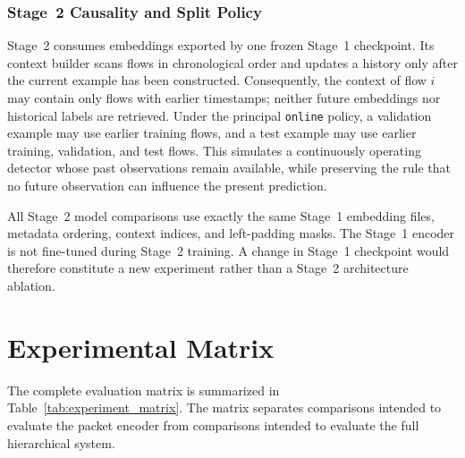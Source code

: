\documentclass[11pt,fleqn]{report}
\begin{document}
\subsubsection{Stage~2 Causality and Split Policy}
\label{subsubsec:stage2_evaluation_causality}

Stage~2 consumes embeddings exported by one frozen Stage~1 checkpoint. Its
context builder scans flows in chronological order and updates a history only
after the current example has been constructed. Consequently, the context of
flow $i$ may contain only flows with earlier timestamps; neither future
embeddings nor historical labels are retrieved. Under the principal
\texttt{online} policy, a validation example may use earlier training flows,
and a test example may use earlier training, validation, and test flows. This
simulates a continuously operating detector whose past observations remain
available, while preserving the rule that no future observation can influence
the present prediction.

All Stage~2 model comparisons use exactly the same Stage~1 embedding files,
metadata ordering, context indices, and left-padding masks. The Stage~1 encoder
is not fine-tuned during Stage~2 training. A change in Stage~1 checkpoint would
therefore constitute a new experiment rather than a Stage~2 architecture
ablation.

\section{Experimental Matrix}
\label{subsec:experimental_matrix}

The complete evaluation matrix is summarized in
Table~\ref{tab:experiment_matrix}. The matrix separates comparisons intended
to evaluate the packet encoder from comparisons intended to evaluate the full
hierarchical system.
\end{document}
